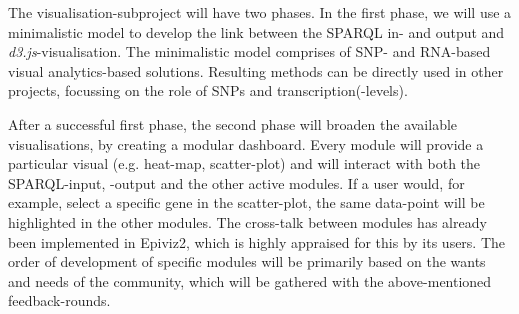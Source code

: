 \documentclass[twoside,fontsize=10pt]{article}
\begin{document}
\noindent
The visualisation-subproject will have two phases. In the first phase, we will use a minimalistic model to develop the link between the SPARQL in- and output and \textit{d3.js}-visualisation. The minimalistic model comprises of SNP- and RNA-based visual analytics-based solutions. Resulting methods can be directly used in other projects, focussing on the role of SNPs and transcription(-levels).

After a successful first phase, the second phase will broaden the available visualisations, by creating a modular dashboard. Every module will provide a particular visual (e.g. heat-map, scatter-plot) and will interact with both the SPARQL-input, -output and the other active modules. If a user would, for example, select a specific gene in the scatter-plot, the same data-point will be highlighted in the other modules. The cross-talk between modules has already been implemented in Epiviz2\cite{Chelaru2014}, which is highly appraised for this by its users. The order of development of specific modules will be primarily based on the wants and needs of the community, which will be gathered with the above-mentioned feedback-rounds.
\end{document}
